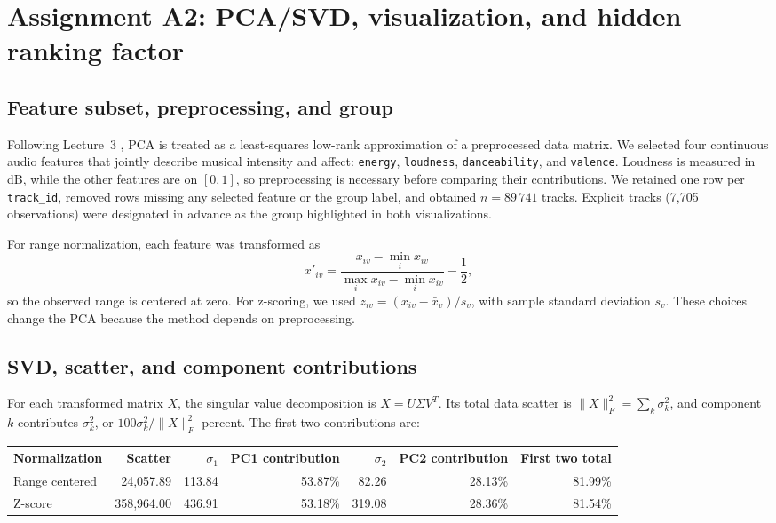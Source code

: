 \documentclass[11pt,a4paper]{article}
\begin{document}
\section{Assignment A2: PCA/SVD, visualization, and hidden ranking factor}

\subsection{Feature subset, preprocessing, and group}

Following Lecture~3 \citep{lecture3}, PCA is treated as a least-squares low-rank approximation
of a preprocessed data matrix. We selected four continuous audio features that
jointly describe musical intensity and affect: \texttt{energy},
\texttt{loudness}, \texttt{danceability}, and \texttt{valence}. Loudness is
measured in dB, while the other features are on $[0,1]$, so preprocessing is
necessary before comparing their contributions. We retained one row per
\texttt{track\_id}, removed rows missing any selected feature or the group
label, and obtained $n=89\,741$ tracks. Explicit tracks (7,705 observations)
were designated in advance as the group highlighted in both visualizations.

For range normalization, each feature was transformed as
\[
 x'_{iv}=\frac{x_{iv}-\min_i x_{iv}}{\max_i x_{iv}-\min_i x_{iv}}-\frac12,
\]
so the observed range is centered at zero. For z-scoring, we used
$z_{iv}=(x_{iv}-\bar{x}_v)/s_v$, with sample standard deviation $s_v$.
These choices change the PCA because the method depends on preprocessing.

\subsection{SVD, scatter, and component contributions}

For each transformed matrix $X$, the singular value decomposition is
$X=U\Sigma V^T$. Its total data scatter is
$\|X\|_F^2=\sum_k\sigma_k^2$, and component $k$ contributes
$\sigma_k^2$, or $100\sigma_k^2/\|X\|_F^2$ percent. The first two
contributions are:
\begin{center}
\begin{tabular}{lrrrrrr}
\toprule
Normalization & Scatter & $\sigma_1$ & PC1 contribution & $\sigma_2$ & PC2 contribution & First two total \\
\midrule
Range centered & 24,057.89 & 113.84 & 53.87\% & 82.26 & 28.13\% & 81.99\% \\
Z-score & 358,964.00 & 436.91 & 53.18\% & 319.08 & 28.36\% & 81.54\% \\
\bottomrule
\end{tabular}
\end{center}
\end{document}
